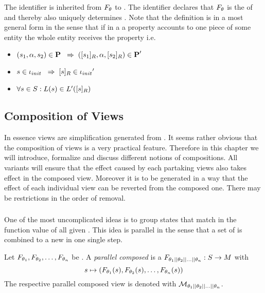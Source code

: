 \documentclass[preview]{standalone}
\begin{document}
The identifier \viewppty is inherited from $\grpfct$ to \view. The identifier declares that $\grpfct$ is the \grpfctN of \view and thereby also uniquely determines \view. Note that the definition is in a most general form in the sense that if in a \viewN a property accounts to one piece of some entity the whole entity receives the property i.e. 
\begin{itemize}	
	\item $(\state_1, \action, \state_2) \in \trans \impr (\eqclassv[\state_1], \action, \eqclassv[\state_2]) \in \trans'$
	\item $\state \in \init \impr \eqclassv \in \initdistrib'$
	\item $\forall \state \in \states : \labelingfct(\state) \in \labelingfct'(\eqclassv)$
\end{itemize}



\subsection{Composition of Views}
In essence views are simplification generated from \chosengraphtypeN. It seems rather obvious that the composition of views is a very practical feature. Therefore in this chapter we will introduce, formalize and discuss different notions of compositions. All variants will ensure that the effect caused by each partaking views also takes effect in the composed view. Moreover it is to be generated in a way that the effect of each individual view can be reverted from the composed one. There may be restrictions in the order of removal.

\subsubsection{\parllcompNCC}
One of the most uncomplicated ideas is to group states that match in the function value of all given \grpfctsN. This idea is parallel in the sense that a set of \grpfctN is combined to a new \grpfctN in one single step.
\begin{definition}
	Let $\grpfct[\viewppty_1], \grpfct[\viewppty_2], \dots, \grpfct[\viewppty_n]$ be \grpfctsN. A \emph{parallel composed \grpfctN} is a \grpfctN $\grpfct[{\viewppty_1 \pll \viewppty_2 \pll \dots \pll \viewppty_n}]: \states \to \arbset$ with
	\[
	\state \mapsto (\grpfct[\viewppty_1](\state), \grpfct[\viewppty_2](\state), \dots, \grpfct[\viewppty_n](\state))
	\] 
	The respective parallel composed view is denoted with $\view[\viewppty_1 \pll \viewppty_2 \pll \dots \pll 
	\viewppty_n]$.
		
\end{definition}
\end{document}
